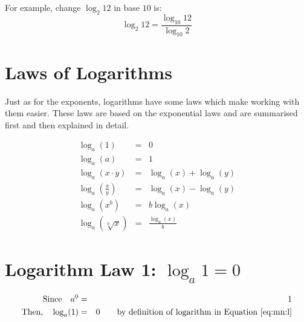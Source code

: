 For example, change $\log_{2}12$ in base $10$ is:
\begin{equation*}
\log_{2}12=\frac{\log_{10}12}{\log_{10}2}
\end{equation*}

\section{Laws of Logarithms}
Just as for the exponents, logarithms have some laws which make working with them easier. These laws are based on the exponential laws and are summarised first and then explained in detail.

\begin{eqnarray}
\label{eq:mn:l:law1}
\log_{a}(1)&=&0\\
\label{eq:mn:l:law2}
\log_{a}(a)&=&1 \\
\label{eq:mn:l:law3}
\log_{a}(x\cdot y) &=& \log_{a}(x) + \log_{a}(y)\\
\label{eq:mn:l:law4}
\log_{a}\left(\frac{x}{y}\right) &=& \log_{a}(x) - \log_{a}(y) \\
\label{eq:mn:l:law5}
\log_{a}(x^b) &=& b \log_{a}(x)\\
\label{eq:mn:l:law6}
\log_{a}\left(\sqrt[b]{x}\right) &=& \frac{\log_{a}(x)}{b}
\end{eqnarray}

\section{Logarithm Law 1: $\log_{a}1 = 0$}
\begin{eqnarray*}
\mbox{Since}\quad a^0&=&1\\
\mbox{Then,}\quad \log_{a}(1)&=&0\qquad \mbox{by definition of logarithm in Equation~\ref{eq:mn:l}}
\end{eqnarray*}

